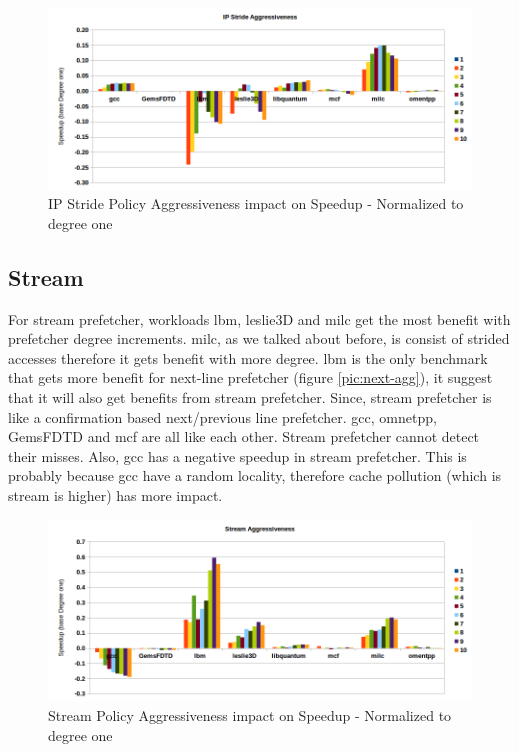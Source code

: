 \documentclass{article}
\begin{document}
\begin{figure}[!h]
  \label{pic:ip-agg}
  \centering
    \includegraphics[width=1\textwidth]{ip_agg.png}
    \caption{IP Stride Policy Aggressiveness impact on Speedup - Normalized to degree one}
\end{figure}

\subsection{Stream}
For stream prefetcher, workloads lbm, leslie3D and milc get the most benefit with prefetcher degree increments. milc, as we talked about before, is consist of strided accesses therefore it gets benefit with more degree. lbm is the only benchmark that gets more benefit for next-line prefetcher (figure \ref{pic:next-agg}), it suggest that it will also get benefits from stream prefetcher. Since, stream prefetcher is like a confirmation based next/previous line prefetcher. gcc, omnetpp, GemsFDTD and mcf are all like each other. Stream prefetcher cannot detect their misses. Also, gcc has a negative speedup in stream prefetcher. This is probably because gcc have a random locality, therefore cache pollution (which is stream is higher) has more impact.

\begin{figure}[!h]
  \label{pic:stream-agg}
  \centering
    \includegraphics[width=1\textwidth]{stream_agg.png}
    \caption{Stream Policy Aggressiveness impact on Speedup - Normalized to degree one}
\end{figure}
\end{document}

